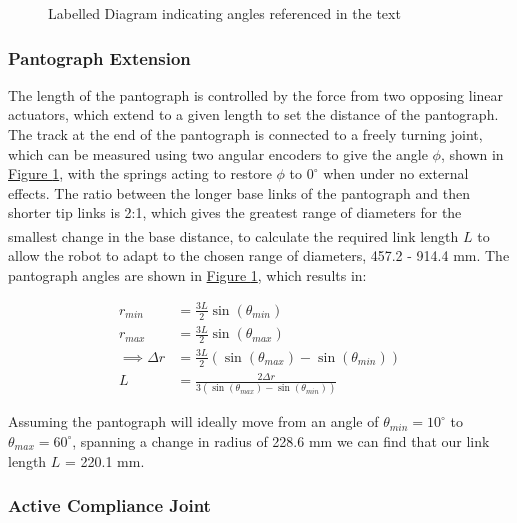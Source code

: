 \documentclass[11pt]{article}		%
\newcommand{\supercite}[1]{\textsuperscript{\cite{#1}}}		%
\newcommand{\figref}[1]{\hyperref[#1]{Figure \ref*{#1}}}    %
\begin{document}
\begin{figure}[h]
\begin{multicols}{2}
					\caption{Labelled Diagram indicating angles referenced in the text}
					\label{legDiagram}
				\end{multicols}
			\end{figure}
			
			\subsubsection{Pantograph Extension}
			
				The length of the pantograph is controlled by the force from two opposing linear actuators, which extend to a given length to set the distance of the pantograph.
				The track at the end of the pantograph is connected to a freely turning joint, which can be measured using two angular encoders to give the angle $\phi$, shown in \figref{legDiagram}, with the springs acting to restore $\phi$ to $0^\circ$ when under no external effects.
				The ratio between the longer base links of the pantograph and then shorter tip links is 2:1, which gives the greatest range of diameters for the smallest change in the base distance\supercite{okada1987mogrer}, to calculate the required link length $L$ to allow the robot to adapt to the chosen range of diameters, 457.2 - 914.4 mm.
				The pantograph angles are shown in \figref{legDiagram}, which results in:
				
				\begin{align}
					r_{min} &= \frac{3L}{2} \sin \left( \theta_{min} \right) \label{rMin}
					\\
					r_{max} &= \frac{3L}{2} \sin \left( \theta_{max} \right)
					\\
					\implies \Delta r &= \frac{3L}{2} \left( \sin \left( \theta_{max} \right) - \sin \left( \theta_{min} \right) \right)
					\\
					L &= \frac{2 \Delta r}{3 \left( \sin \left( \theta_{max} \right) - \sin \left( \theta_{min} \right) \right)}
				\end{align}
							
				Assuming the pantograph will ideally move from an angle of $\theta_{min} = 10^\circ$ to $\theta_{max} = 60^\circ$, spanning a change in radius of 228.6 mm we can find that our link length $L$ = 220.1 mm.
			
			\subsubsection{Active Compliance Joint}
			
\end{document}
